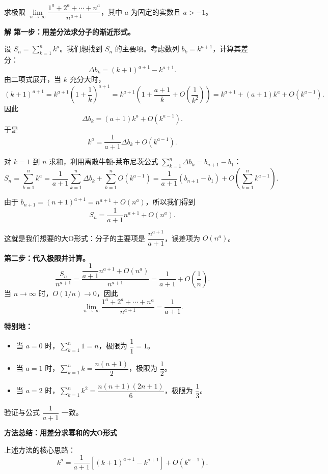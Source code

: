 \documentclass{ctexart}
\newenvironment{custom}[1]{\par\noindent \textbf{#1}\quad}{\par\vspace{1em}}
\begin{document}
\begin{example}[加减结构中的错误示例]
\begin{example}求极限 \(\lim\limits_{n\to\infty} \dfrac{1^a + 2^a + \cdots + n^a}{n^{a+1}}\)，其中 \(a\) 为固定的实数且 \(a > -1\)。
\end{example}

\begin{custom}{解}
\textbf{第一步：用差分法求分子的渐近形式。}

设 \(S_n = \sum_{k=1}^n k^a\)。我们想找到 \(S_n\) 的主要项。考虑数列 \(b_k = k^{a+1}\)，计算其差分：
\[
\Delta b_k = (k+1)^{a+1} - k^{a+1}.
\]
由二项式展开，当 \(k\) 充分大时，
\[
(k+1)^{a+1} = k^{a+1} \left(1 + \dfrac{1}{k}\right)^{a+1} = k^{a+1} \left(1 + \dfrac{a+1}{k} + O\left(\dfrac{1}{k^2}\right)\right) = k^{a+1} + (a+1)k^a + O(k^{a-1}).
\]
因此
\[
\Delta b_k = (a+1)k^a + O(k^{a-1}).
\]
于是
\[
k^a = \dfrac{1}{a+1} \Delta b_k + O(k^{a-1}).
\]

对 \(k = 1\) 到 \(n\) 求和，利用离散牛顿-莱布尼茨公式 \(\sum_{k=1}^n \Delta b_k = b_{n+1} - b_1\)：
\[
S_n = \sum_{k=1}^n k^a = \dfrac{1}{a+1} \sum_{k=1}^n \Delta b_k + \sum_{k=1}^n O(k^{a-1}) = \dfrac{1}{a+1} (b_{n+1} - b_1) + O\left(\sum_{k=1}^n k^{a-1}\right).
\]

由于 \(b_{n+1} = (n+1)^{a+1} = n^{a+1} + O(n^a)\)，所以我们得到
\[
S_n = \dfrac{1}{a+1} n^{a+1} + O(n^a).
\]

这就是我们想要的大O形式：分子的主要项是 \(\dfrac{n^{a+1}}{a+1}\)，误差项为 \(O(n^a)\)。

\textbf{第二步：代入极限并计算。}
\[
\dfrac{S_n}{n^{a+1}} = \dfrac{\dfrac{1}{a+1} n^{a+1} + O(n^a)}{n^{a+1}} = \dfrac{1}{a+1} + O\left(\dfrac{1}{n}\right).
\]
当 \(n \to \infty\) 时，\(O(1/n) \to 0\)，因此
\[
\lim_{n\to\infty} \dfrac{1^a + 2^a + \cdots + n^a}{n^{a+1}} = \dfrac{1}{a+1}.
\]

\textbf{特别地：}
\begin{itemize}
\item 当 \(a = 0\) 时，\(\sum_{k=1}^n 1 = n\)，极限为 \(\dfrac{1}{1} = 1\)。
\item 当 \(a = 1\) 时，\(\sum_{k=1}^n k = \dfrac{n(n+1)}{2}\)，极限为 \(\dfrac{1}{2}\)。
\item 当 \(a = 2\) 时，\(\sum_{k=1}^n k^2 = \dfrac{n(n+1)(2n+1)}{6}\)，极限为 \(\dfrac{1}{3}\)。
\end{itemize}
验证与公式 \(\dfrac{1}{a+1}\) 一致。
\end{custom}

\begin{custom}{方法总结：用差分求幂和的大O形式}

上述方法的核心思路：
\[
k^a = \dfrac{1}{a+1} \left[(k+1)^{a+1} - k^{a+1}\right] + O(k^{a-1}).
\]


\end{custom}
\end{example}
\end{document}
